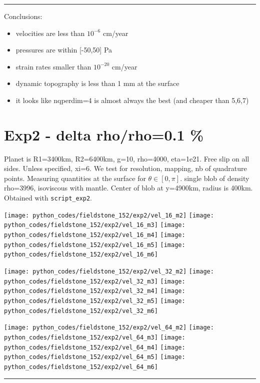 \hrule

Conclusions:
\begin{itemize}
\item velocities are less than $10^{-6}$ cm/year 
\item pressures are within [-50,50] Pa
\item strain rates smaller than $10^{-20}$ cm/year 
\item dynamic topography is less than 1 mm at the surface 
\item it looks like nqperdim=4 is almost always the best (and cheaper than 5,6,7)
\end{itemize}



\newpage
\section*{Exp2 - delta rho/rho=0.1 \%}

Planet is R1=3400km, R2=6400km, g=10, rho=4000, eta=1e21.
Free slip on all sides. Unless specified, xi=6.
We test for resolution, mapping, nb of quadrature points.
Measuring quantities at the surface for $\theta\in[0,\pi]$.
single blob of density rho=3996, isoviscous with mantle.
Center of blob at y=4900km, radius is 400km.
Obtained with {\tt script\_exp2}.

\noindent
\texttt{[image: python\_codes/fieldstone\_152/exp2/vel\_16\_m2]}
\texttt{[image: python\_codes/fieldstone\_152/exp2/vel\_16\_m3]}
\texttt{[image: python\_codes/fieldstone\_152/exp2/vel\_16\_m4]}
\texttt{[image: python\_codes/fieldstone\_152/exp2/vel\_16\_m5]}
\texttt{[image: python\_codes/fieldstone\_152/exp2/vel\_16\_m6]}

\noindent
\texttt{[image: python\_codes/fieldstone\_152/exp2/vel\_32\_m2]}
\texttt{[image: python\_codes/fieldstone\_152/exp2/vel\_32\_m3]}
\texttt{[image: python\_codes/fieldstone\_152/exp2/vel\_32\_m4]}
\texttt{[image: python\_codes/fieldstone\_152/exp2/vel\_32\_m5]}
\texttt{[image: python\_codes/fieldstone\_152/exp2/vel\_32\_m6]}

\noindent
\texttt{[image: python\_codes/fieldstone\_152/exp2/vel\_64\_m2]}
\texttt{[image: python\_codes/fieldstone\_152/exp2/vel\_64\_m3]}
\texttt{[image: python\_codes/fieldstone\_152/exp2/vel\_64\_m4]}
\texttt{[image: python\_codes/fieldstone\_152/exp2/vel\_64\_m5]}
\texttt{[image: python\_codes/fieldstone\_152/exp2/vel\_64\_m6]}

\hrule


